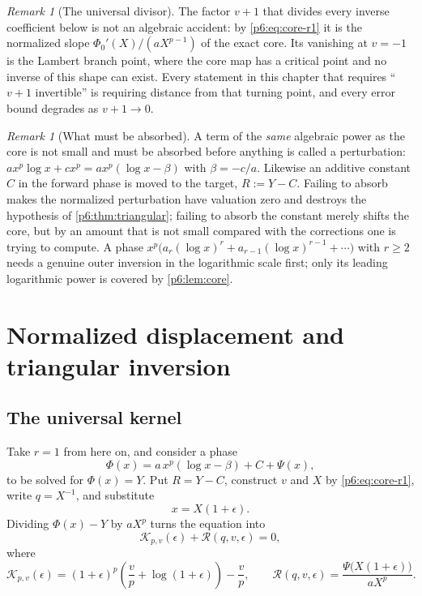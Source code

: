 \documentclass[11pt,a4paper,oneside]{book}
\theoremstyle{plain}
\theoremstyle{definition}
\theoremstyle{remark}
\newtheorem{remark}[theorem]{Remark}
\begin{document}
\begin{remark}[The universal divisor]\label{p6:rem:universal-divisor}
The factor $v+1$ that divides every inverse coefficient below is not an
algebraic accident: by \eqref{p6:eq:core-r1} it is the normalized slope
$\Phi_0'(X)/(aX^{p-1})$ of the exact core.  Its vanishing at $v=-1$ is the
Lambert branch point, where the core map has a critical point and no inverse
of this shape can exist.  Every statement in this chapter that requires
``$v+1$ invertible'' is requiring distance from that turning point, and every
error bound degrades as $v+1\to0$.
\end{remark}

\begin{remark}[What must be absorbed]\label{p6:rem:absorb}
A term of the \emph{same} algebraic power as the core is not small and must be
absorbed before anything is called a perturbation:
$a x^{p}\log x+cx^{p}=a x^{p}(\log x-\beta)$ with $\beta=-c/a$.  Likewise an
additive constant $C$ in the forward phase is moved to the target,
$R:=Y-C$.  Failing to absorb makes the normalized perturbation have valuation
zero and destroys the hypothesis of \cref{p6:thm:triangular}; failing to
absorb the constant merely shifts the core, but by an amount that is not
small compared with the corrections one is trying to compute.  A phase
$x^{p}\bigl(a_r(\log x)^{r}+a_{r-1}(\log x)^{r-1}+\cdots\bigr)$ with $r\ge2$
needs a genuine outer inversion in the logarithmic scale first; only its
leading logarithmic power is covered by \cref{p6:lem:core}.
\end{remark}

\section{Normalized displacement and triangular inversion}
\label{p6:sec:triangular}

\subsection{The universal kernel}

Take $r=1$ from here on, and consider a phase
\begin{equation}\label{p6:eq:perturbed-phase}
 \Phi(x)=a\,x^{p}(\log x-\beta)+C+\Psi(x),
\end{equation}
to be solved for $\Phi(x)=Y$.  Put $R=Y-C$, construct $v$ and $X$ by
\eqref{p6:eq:core-r1}, write $q=X^{-1}$, and substitute
\begin{equation}\label{p6:eq:relative-displacement}
 x=X(1+\epsilon).
\end{equation}
Dividing $\Phi(x)-Y$ by $aX^{p}$ turns the equation into
\begin{equation}\label{p6:eq:normalized}
 \mathcal{K}_{p,v}(\epsilon)+\mathcal{R}(q,v,\epsilon)=0,
\end{equation}
where
\begin{equation}\label{p6:eq:kernel}
 \mathcal{K}_{p,v}(\epsilon)
 =(1+\epsilon)^{p}\left(\frac vp+\log(1+\epsilon)\right)-\frac vp,
 \qquad
 \mathcal{R}(q,v,\epsilon)=\frac{\Psi\bigl(X(1+\epsilon)\bigr)}{aX^{p}} .
\end{equation}
\end{document}
